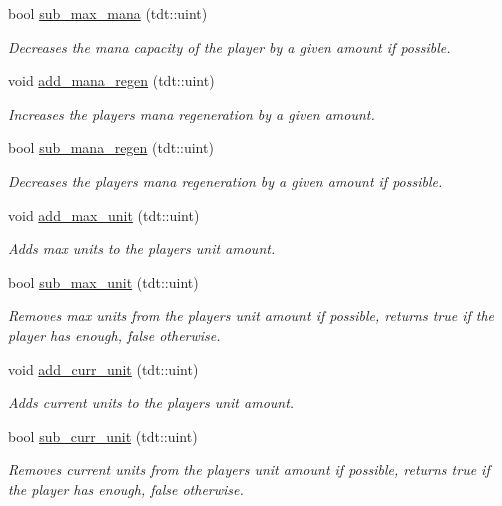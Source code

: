 \begin{DoxyCompactItemize}
bool \hyperlink{class_player_ab12859f79a9a17fc41163e2dfb5b9e92}{sub\+\_\+max\+\_\+mana} (tdt\+::uint)
\begin{DoxyCompactList}\small\item\em Decreases the mana capacity of the player by a given amount if possible. \end{DoxyCompactList}\item 
void \hyperlink{class_player_aca252f99178aedd77d8715b5cbf6ae6a}{add\+\_\+mana\+\_\+regen} (tdt\+::uint)
\begin{DoxyCompactList}\small\item\em Increases the player\textquotesingle{}s mana regeneration by a given amount. \end{DoxyCompactList}\item 
bool \hyperlink{class_player_a6dd9b46164c9d4c5985988345afca5b5}{sub\+\_\+mana\+\_\+regen} (tdt\+::uint)
\begin{DoxyCompactList}\small\item\em Decreases the player\textquotesingle{}s mana regeneration by a given amount if possible. \end{DoxyCompactList}\item 
void \hyperlink{class_player_ab67c719fcf29001cca7dbe2bb4cc1910}{add\+\_\+max\+\_\+unit} (tdt\+::uint)
\begin{DoxyCompactList}\small\item\em Adds max units to the player\textquotesingle{}s unit amount. \end{DoxyCompactList}\item 
bool \hyperlink{class_player_aa68dc892a5b18ea5325c46fc54859c46}{sub\+\_\+max\+\_\+unit} (tdt\+::uint)
\begin{DoxyCompactList}\small\item\em Removes max units from the player\textquotesingle{}s unit amount if possible, returns true if the player has enough, false otherwise. \end{DoxyCompactList}\item 
void \hyperlink{class_player_a6dd7b74e451cd7b2018db07091b93bfd}{add\+\_\+curr\+\_\+unit} (tdt\+::uint)
\begin{DoxyCompactList}\small\item\em Adds current units to the player\textquotesingle{}s unit amount. \end{DoxyCompactList}\item 
bool \hyperlink{class_player_a402acd33989ed7f45f2a825f25b7098a}{sub\+\_\+curr\+\_\+unit} (tdt\+::uint)
\begin{DoxyCompactList}\small\item\em Removes current units from the player\textquotesingle{}s unit amount if possible, returns true if the player has enough, false otherwise. \end{DoxyCompactList}\item 

\end{DoxyCompactItemize}
